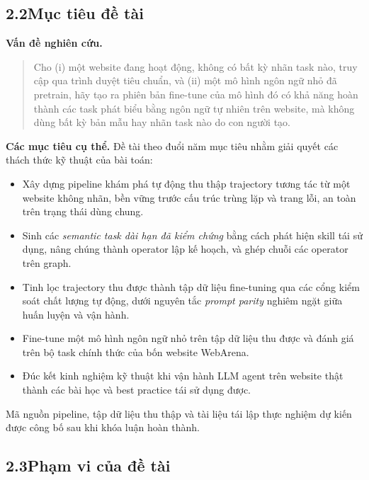 \subsection*{2.2\quad Mục tiêu đề tài}

\textbf{Vấn đề nghiên cứu.}

\begin{quote}
Cho (i) một website đang hoạt động, không có bất kỳ nhãn task nào, truy cập
qua trình duyệt tiêu chuẩn, và (ii) một mô hình ngôn ngữ nhỏ đã pretrain,
hãy tạo ra phiên bản fine-tune của mô hình đó có khả năng hoàn thành các
task phát biểu bằng ngôn ngữ tự nhiên trên website, mà không dùng bất kỳ
bản mẫu hay nhãn task nào do con người tạo.
\end{quote}

\textbf{Các mục tiêu cụ thể.} Đề tài theo đuổi năm mục tiêu nhằm giải quyết các thách thức kỹ thuật của bài toán:

\begin{itemize}
  \item[\textbf{O1.}] Xây dựng pipeline khám phá tự động thu thập trajectory
  tương tác từ một website không nhãn, bền vững trước cấu trúc trùng lặp và
  trang lỗi, an toàn trên trạng thái dùng chung.
  \item[\textbf{O2.}] Sinh các \emph{semantic task dài hạn đã kiểm chứng} bằng
  cách phát hiện skill tái sử dụng, nâng chúng thành operator lập kế hoạch, và
  ghép chuỗi các operator trên graph.
  \item[\textbf{O3.}] Tinh lọc trajectory thu được thành tập dữ liệu
  fine-tuning qua các cổng kiểm soát chất lượng tự động, dưới nguyên tắc
  \emph{prompt parity} nghiêm ngặt giữa huấn luyện và vận hành.
  \item[\textbf{O4.}] Fine-tune một mô hình ngôn ngữ nhỏ trên tập dữ liệu thu
  được và đánh giá trên bộ task chính thức của bốn website WebArena.
  \item[\textbf{O5.}] Đúc kết kinh nghiệm kỹ thuật khi vận hành LLM agent trên
  website thật thành các bài học và best practice tái sử dụng được.
\end{itemize}

Mã nguồn pipeline, tập dữ liệu thu thập và tài liệu tái lập thực nghiệm dự
kiến được công bố sau khi khóa luận hoàn thành.

\subsection*{2.3\quad Phạm vi của đề tài}

